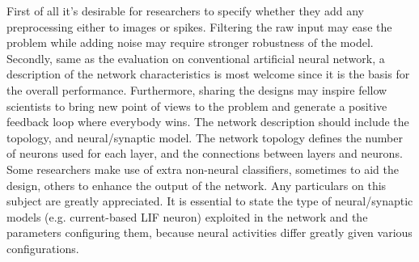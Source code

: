 First of all it's desirable for researchers to specify whether they add any preprocessing either to images or spikes.
Filtering the raw input may ease the problem while adding noise may require stronger robustness of the model.
Secondly, same as the evaluation on conventional artificial neural network, a description of the network characteristics is most welcome since it is the basis for the overall performance.
Furthermore, sharing the designs may inspire fellow scientists to bring new point of views to the problem and generate a positive feedback loop where everybody wins.
The network description should include the topology, and neural/synaptic model.
The network topology defines the number of neurons used for each layer, and the connections between layers and neurons.
Some researchers make use of extra non-neural classifiers, sometimes to aid the design, others to enhance the output of the network.
Any particulars on this subject are greatly appreciated.
It is essential to state the type of neural/synaptic models (e.g. current-based LIF neuron) exploited in the network and the parameters configuring them, because neural activities differ greatly given various configurations.
